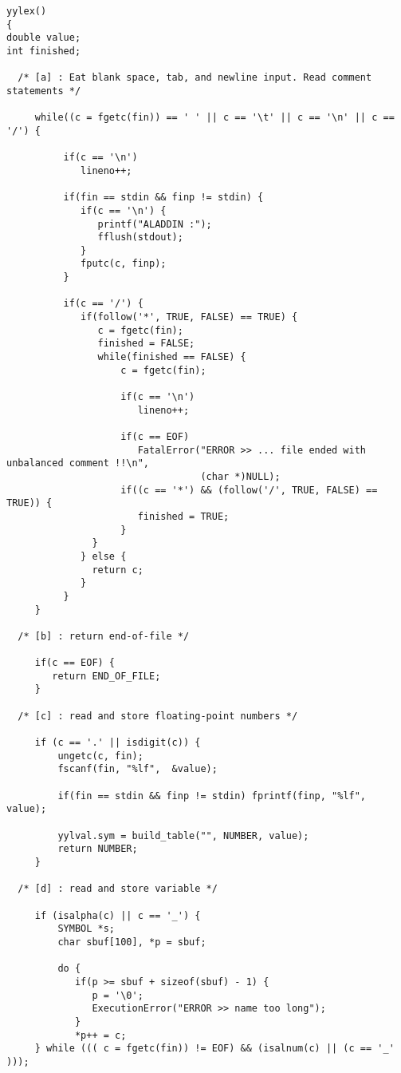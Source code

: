 \begin{footnotesize}
\begin{verbatim}
yylex()
{
double value;
int finished;

  /* [a] : Eat blank space, tab, and newline input. Read comment statements */
       
     while((c = fgetc(fin)) == ' ' || c == '\t' || c == '\n' || c == '/') {

          if(c == '\n') 
             lineno++;

          if(fin == stdin && finp != stdin) {
             if(c == '\n') {
                printf("ALADDIN :");
                fflush(stdout);
             }
             fputc(c, finp);
          }

          if(c == '/') {
             if(follow('*', TRUE, FALSE) == TRUE) {
                c = fgetc(fin);
                finished = FALSE;
                while(finished == FALSE) {
                    c = fgetc(fin);

                    if(c == '\n') 
                       lineno++;

                    if(c == EOF) 
                       FatalError("ERROR >> ... file ended with unbalanced comment !!\n",
                                  (char *)NULL);
                    if((c == '*') && (follow('/', TRUE, FALSE) == TRUE)) {
                       finished = TRUE;
                    }
               }
             } else {
               return c;
             } 
          }
     }

  /* [b] : return end-of-file */

     if(c == EOF) {
        return END_OF_FILE;
     }

  /* [c] : read and store floating-point numbers */

     if (c == '.' || isdigit(c)) {
         ungetc(c, fin);
         fscanf(fin, "%lf",  &value);

         if(fin == stdin && finp != stdin) fprintf(finp, "%lf", value);

         yylval.sym = build_table("", NUMBER, value);
         return NUMBER;
     }

  /* [d] : read and store variable */

     if (isalpha(c) || c == '_') {
         SYMBOL *s;
         char sbuf[100], *p = sbuf;

         do {	
            if(p >= sbuf + sizeof(sbuf) - 1) {
               p = '\0';
               ExecutionError("ERROR >> name too long");
            }
            *p++ = c;
	 } while ((( c = fgetc(fin)) != EOF) && (isalnum(c) || (c == '_' )));


\end{verbatim}
\end{footnotesize}
